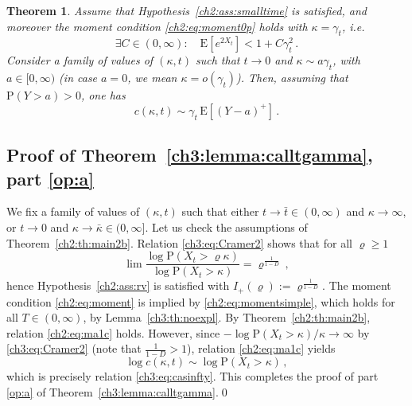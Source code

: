 \documentclass[a4paper,reqno,11pt]{amsart}
\numberwithin{equation}{section}
\newtheorem{theorem}{Theorem}[section]
\newcommand{\PEfont}{\mathrm}
\renewcommand{\P}{\ensuremath{\PEfont P}}
\newcommand{\E}{\ensuremath{\PEfont E}}
\renewcommand{\rho}{\varrho}
\begin{document}
\begin{theorem}\label{ch2:th:main2a}
Assume that Hypothesis~\ref{ch2:ass:smalltime} is satisfied,
and moreover the moment condition \eqref{ch2:eq:moment0p} holds
with $\kappa = \gamma_t$, i.e.
\begin{equation}\label{ch2:eq:assX}
\exists C \in (0, \infty):  \quad
\E\left[e^{2X_t}\right] < 1+ C \gamma_t^2\,.
\end{equation}
Consider a family of values of $(\kappa,t)$ such that
$t \to 0$ and $\kappa \sim a \gamma_t$, with $a \in [0,\infty)$
(in case $a=0$, we mean $\kappa = o(\gamma_t)$). Then,
assuming that $\P(Y > a) > 0$, one has
\begin{equation} \label{ch2:eq:astypical}
	c(\kappa, t) \sim \gamma_t \, \E[(Y-a)^+]  \,.
\end{equation}
\end{theorem}


\subsection{Proof of Theorem~\ref{ch3:lemma:calltgamma}, part \eqref{op:a}}



We fix a family of values of $(\kappa,t)$
such that either $t \to \bar t \in (0,\infty)$ and $\kappa \to \infty$,
or $t \to 0$ and $\kappa \to \bar\kappa \in (0,\infty]$.
Let us check the assumptions of Theorem~\ref{ch2:th:main2b}.
Relation \eqref{ch3:eq:Cramer2} shows that for all $\rho\ge 1$
\begin{equation} \label{ch3:eq:I+}
	\lim \frac{\log \P(X_t > \rho\kappa)}{\log \P(X_t > \kappa)}
	= \rho^{\frac{1}{1-D}} \,,
\end{equation}
hence Hypothesis~\ref{ch2:ass:rv} is satisfied
with $I_+(\rho) := \rho^{\frac{1}{1-D}}$.
The moment condition \eqref{ch2:eq:moment}
is implied by \eqref{ch2:eq:momentsimple}, which holds for all $T \in (0,\infty)$,
by Lemma~\ref{ch3:th:noexpl}.
By Theorem~\ref{ch2:th:main2b}, relation \eqref{ch2:eq:ma1c} holds.
However, since $-\log \P(X_t > \kappa) / \kappa \to \infty$
by \eqref{ch3:eq:Cramer2} (note that $\frac{1}{1-D} > 1$), relation \eqref{ch2:eq:ma1c} yields
\begin{equation} \label{ch3:eq:repc}
	\log c(\kappa,t) \sim  \log \P(X_t > \kappa) \,,
\end{equation}
which is precisely relation \eqref{ch3:eq:casinfty}. This completes the proof of
part \eqref{op:a} of Theorem~\ref{ch3:lemma:calltgamma}.\qed
\end{document}
